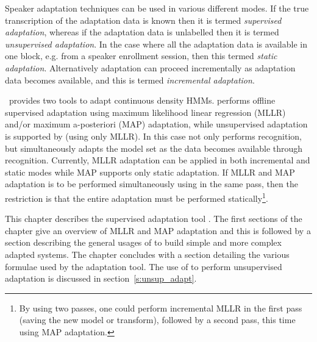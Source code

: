 Speaker adaptation techniques can be used in various different
modes. If
the true transcription of the adaptation data is known then
it is termed 
\textit{supervised adaptation}, 
whereas if the adaptation
data is unlabelled then it is termed 
\textit{unsupervised adaptation}.
In the case where all the adaptation data is available in one block,
e.g. from a speaker enrollment session, then this termed \textit{static
adaptation}. Alternatively adaptation can proceed incrementally as
adaptation data becomes available, and this is termed 
\textit{incremental adaptation}.  

\HTK\ provides two tools to adapt continuous density HMMs. 
performs offline supervised adaptation
using maximum likelihood linear regression (MLLR) and/or 
maximum a-posteriori (MAP) adaptation, while  
unsupervised adaptation is supported by  (using only MLLR).
In this case  not only performs recognition, but
simultaneously adapts the model set as the data becomes available
through recognition. Currently, MLLR adaptation can be applied in both
incremental and static modes while MAP supports only static
adaptation. If MLLR and MAP adaptation is to be performed
simultaneously using 
 in the same pass, 
then the restriction is that the entire
adaptation must be performed statically\footnote{
By using two passes,
one could perform incremental MLLR in the first pass (saving the new
model or transform), followed by a second pass, this time using MAP 
adaptation.}.

This chapter describes the supervised adaptation tool .
The first sections of the chapter
give an overview of MLLR and MAP adaptation and 
this is followed by a section describing the general
usages of  to build simple and more complex adapted
systems. The chapter concludes with a section detailing the various
formulae used by the adaptation tool.
The use of  to perform unsupervised adaptation is 
discussed in section~\ref{s:unsup_adapt}. 



